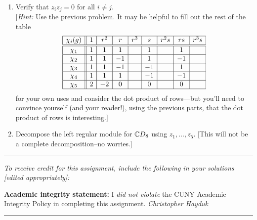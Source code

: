 \documentclass[11pt, reqno]{amsart}
\theoremstyle{plain}
\theoremstyle{definition}
\theoremstyle{example}
\begin{document}
\begin{enumerate}[1.]
\begin{enumerate}
\item Verify that $z_i z_j = 0$ for all $i \ne j$.\\
{[\emph{Hint:} Use the previous problem. It may be helpful to fill out the rest of the table
$$\begin{array}{|c||c|c|c|c|c|c|c|c|}\hline
\chi_i(g) & 1 & r^2 & r & r^3 &  s & r^2 s &  rs & r^3 s\\\hline\hline
\chi_1 	& 1 & 1 & 1 && 1 && 1 &\\\hline
\chi_2 	& 1 & 1 & -1 && 1 && -1 &\\\hline
\chi_3	& 1 & 1 & -1 && -1 && 1 &\\\hline
\chi_4	& 1 & 1 & 1 && -1 && -1 &\\\hline
\chi_5 	& 2 & -2 & 0 && 0 && 0 &\\\hline
\end{array}$$
for your own uses and consider the dot product of rows---but you'll need to convince yourself (and your reader!), using the previous parts, that the dot product of rows is interesting.]}

\item Decompose the left regular module for $\mathbb{C} D_8$ using $z_1, \dots, z_5$. {[This will not be a complete decomposition--no worries.]}
\end{enumerate}


\end{enumerate}






\vfill


\hrule
\emph{\small To receive credit for this assignment, include the following in your solutions [edited appropriately]:}

\smallskip

\textbf{Academic integrity statement:} I \emph{did not violate} the CUNY Academic Integrity Policy in completing this assignment. \hfill \emph{Christopher Hayduk}

\medskip
\hrule

\vfill
\end{document}
